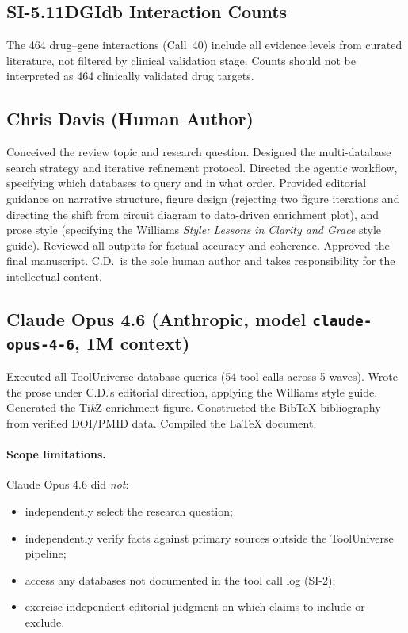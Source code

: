 \subsection*{SI-5.11\quad DGIdb Interaction Counts}

The 464 drug--gene interactions (Call~40) include all evidence levels from
curated literature, not filtered by clinical validation stage.  Counts
should not be interpreted as 464 clinically validated drug targets.



\subsection*{Chris Davis (Human Author)}

Conceived the review topic and research question.  Designed the multi-database
search strategy and iterative refinement protocol.  Directed the agentic
workflow, specifying which databases to query and in what order.  Provided
editorial guidance on narrative structure, figure design (rejecting two figure
iterations and directing the shift from circuit diagram to data-driven
enrichment plot), and prose style (specifying the Williams \emph{Style:
Lessons in Clarity and Grace} style guide).  Reviewed all outputs for factual
accuracy and coherence.  Approved the final manuscript.  C.D.\ is the sole
human author and takes responsibility for the intellectual content.

\subsection*{Claude Opus 4.6 (Anthropic, model \texttt{claude-opus-4-6}, 1M context)}

Executed all ToolUniverse database queries (54 tool calls across 5 waves).
Wrote the prose under C.D.'s editorial direction, applying the Williams style
guide.  Generated the Ti\textit{k}Z enrichment figure.  Constructed the
Bib\TeX{} bibliography from verified DOI/PMID data.  Compiled the \LaTeX{}
document.

\paragraph{Scope limitations.}
Claude Opus 4.6 did \emph{not}:
\begin{itemize}[nosep]
  \item independently select the research question;
  \item independently verify facts against primary sources outside the
        ToolUniverse pipeline;
  \item access any databases not documented in the tool call log (SI-2);
  \item exercise independent editorial judgment on which claims to include or
        exclude.
\end{itemize}

